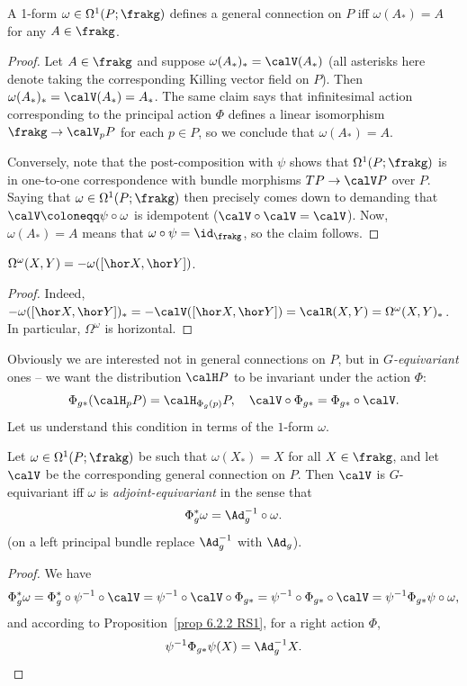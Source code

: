 \begin{prop}
    A 1-form $\omega\in\Omega^1(P;\frakg)$ defines a general connection on $P$ iff $\omega(A_\ast)=A$ for any $A\in\frakg$.
\end{prop}
\begin{proof}
    Let $A\in\frakg$ and suppose $\omega(A_\ast)_\ast=\calV(A_\ast)$ (all asterisks here denote taking the corresponding Killing vector field on $P$).  Then $\omega(A_\ast)_\ast=\calV(A_\ast)=A_\ast$. The same claim says that infinitesimal action corresponding to the principal action $\Phi$ defines a linear isomorphism $\frakg\to \calV_pP$ for each $p\in P$, so we conclude that $\omega(A_\ast)=A$. 

    Conversely, note that the post-composition with $\psi$ shows that $\Omega^1(P;\frakg)$ is in one-to-one correspondence with bundle morphisms $TP\to \calV P$ over $P$. Saying that $\omega\in\Omega^1(P;\frakg)$ then precisely comes down to demanding that $\calV\coloneqq \psi\circ\omega$ is idempotent ($\calV\circ\calV=\calV$). Now, $\omega(A_\ast)=A$ means that $\omega\circ\psi=\id_\frakg$, so the claim follows.
\end{proof}
\begin{cor}\label{cor curvature 2-form}
    $\Omega^\omega(X,Y)=-\omega([\hor X,\hor Y])$.
\end{cor}
\begin{proof}
    Indeed, $-\omega([\hor X,\hor Y])_\ast=-\calV([\hor X,\hor Y])=\calR(X,Y)=\Omega^\omega(X,Y)_\ast$. In particular, $\Omega^\omega$ is horizontal.
\end{proof}

Obviously we are interested not in general connections on $P$, but in \emph{$G$-equivariant} ones -- we want the distribution $\calH P$ to be invariant under the action $\Phi$:
\[\Phi_{g\ast}(\calH_pP)=\calH_{\Phi_g(p)}P,\quad \calV\circ \Phi_{g\ast}=\Phi_{g\ast}\circ \calV.\]
Let us understand this condition in terms of the $1$-form $\omega$.

\begin{prop}
    Let $\omega\in\Omega^1(P;\frakg)$ be such that $\omega(X_\ast)=X$ for all $X\in\frakg$, and let $\calV$ be the corresponding general connection on $P$. Then $\calV$ is $G$-equivariant iff $\omega$ is \emph{adjoint-equivariant} in the sense that 
    \[\Phi_g^\ast\omega=\Ad_{g}^{-1}\circ\omega.\]
    (on a left principal bundle replace $\Ad_g^{-1}$ with $\Ad_g$).
\end{prop}
\begin{proof}
    We have
    \[\Phi^\ast_g\omega=\Phi^\ast_g\circ\psi^{-1}\circ \calV=\psi^{-1}\circ\calV\circ \Phi_{g\ast}=\psi^{-1}\circ\Phi_{g\ast}\circ\calV=\psi^{-1}\Phi_{g\ast}\psi\circ\omega,\]
    and according to Proposition~\ref{prop 6.2.2 RS1}, for a right action $\Phi$,
    \[\psi^{-1}\Phi_{g\ast}\psi(X)=\Ad_g^{-1}X.\]
\end{proof}


